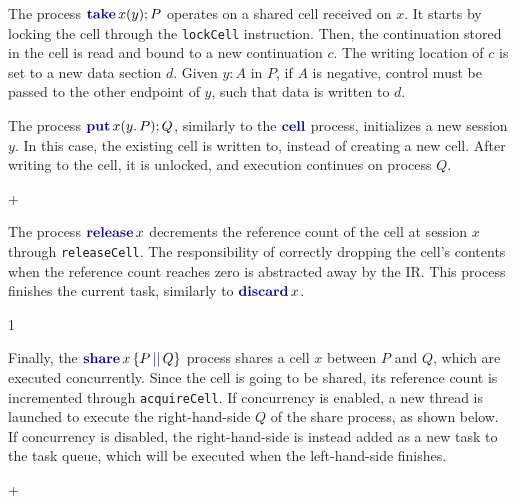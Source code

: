 The process $\takec{x}{y}P$ operates on a shared cell received on $x$. It starts by locking the cell through the \texttt{lockCell} instruction. Then, the continuation stored in the cell is read and bound to a new continuation $c$. The writing location of $c$ is set to a new data section $d$. Given $y: A$ in $P$, if $A$ is negative, control must be passed to the other endpoint of $y$, such that data is written to $d$.
\begin{compilation}{\theta}{\Delta}{}
{}
     
\end{compilation}

The process $\putc{x}{y}{P}Q$, similarly to the $\cellp$ process, initializes a new session $y$. In this case, the existing cell is written to, instead of creating a new cell. After writing to the cell, it is unlocked, and execution continues on process $Q$.
\begin{compilation}{\theta}{\Delta}{}
{ + }
\end{compilation}

The process $\releasec{x}$ decrements the reference count of the cell at session $x$ through \texttt{releaseCell}. The responsibility of correctly dropping the cell's contents when the reference count reaches zero is abstracted away by the \ac{IR}. This process finishes the current task, similarly to $\discardc{x}$.
\begin{compilation}{\theta}{\Delta}{}{1}
    \poptask{\hasexitpoint} 
\end{compilation}

Finally, the $\sharec{x}{P}{Q}$ process shares a cell $x$ between $P$ and $Q$, which are executed concurrently. Since the cell is going to be shared, its reference count is incremented through \texttt{acquireCell}. If concurrency is enabled, a new thread is launched to execute the right-hand-side $Q$ of the share process, as shown below. If concurrency is disabled, the right-hand-side is instead added as a new task to the task queue, which will be executed when the left-hand-side finishes.
\begin{compilation}{\theta}{\Delta}{}
{ + }
\end{compilation}

